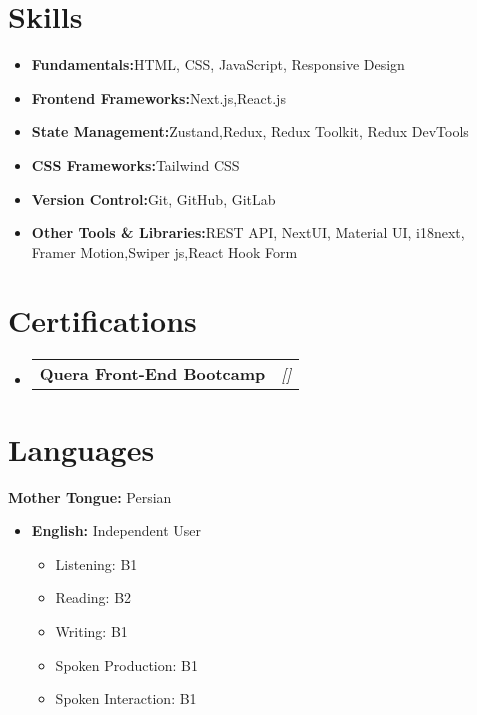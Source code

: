 \documentclass[a4paper,11pt]{article}
\makeatletter
\newcommand{\resumeItem}[2]{
  \item{
    \textbf{#1}{\hspace{0.5mm}#2 \vspace{-0.5mm}}
  }
}
\newcommand{\resumePOR}[3]{
\vspace{0.5mm}\item
    \begin{tabular*}{0.97\textwidth}[t]{l@{\extracolsep{\fill}}r}
        \textbf{#1}\hspace{0.3mm}#2 & \textit{\small{#3}} 
    \end{tabular*}
    \vspace{-2mm}
}
\newcommand{\resumeSubItem}[2]{\resumeItem{#1}{#2}\vspace{4pt}}
\newcommand{\resumeSubHeadingListStart}{\begin{itemize}[leftmargin=*,labelsep=1mm]}
\newcommand{\resumeHeadingSkillStart}{\begin{itemize}[leftmargin=*,itemsep=1.7mm, rightmargin=2ex]}
\newcommand{\resumeSubHeadingListEnd}{\end{itemize}\vspace{2mm}}
\newcommand{\resumeHeadingSkillEnd}{\end{itemize}\vspace{-2mm}}
\makeatother
\begin{document}
\section{\textbf{Skills}}
\vspace{-0.4mm}
\resumeHeadingSkillStart

\resumeSubItem{Fundamentals:}
  {HTML, CSS, JavaScript, Responsive Design}
\resumeSubItem{Frontend Frameworks:}
  {Next.js,React.js}
\resumeSubItem{State Management:}
  {Zustand,Redux, Redux Toolkit, Redux DevTools}
\resumeSubItem{CSS Frameworks:}
  {Tailwind CSS}
\resumeSubItem{Version Control:}
  {Git, GitHub, GitLab}
\resumeSubItem{Other Tools \& Libraries:}
  {REST API, NextUI, Material UI, i18next, Framer Motion,Swiper js,React Hook Form}

\resumeHeadingSkillEnd

\section{\textbf{Certifications}}
\vspace{-0.2mm}
\resumeSubHeadingListStart
\resumePOR
    {Quera Front-End Bootcamp}
    {}
{{[\href{https://quera.org/media/public/quera_certificate/0669e232806f46ea83cdae4217677549.jpg}{\faIcon{globe}}]}}
\resumeSubHeadingListEnd



\section{\textbf{Languages}}
\vspace{-0.4mm}

\textbf{Mother Tongue:} Persian \\
\begin{itemize}
  \item \textbf{English:} Independent User \begin{itemize}
      \item Listening: B1
      \item Reading: B2
      \item Writing: B1
      \item Spoken Production: B1
      \item Spoken Interaction: B1 \end{itemize}
\end{itemize}

\vspace{-4mm}
\end{document}
